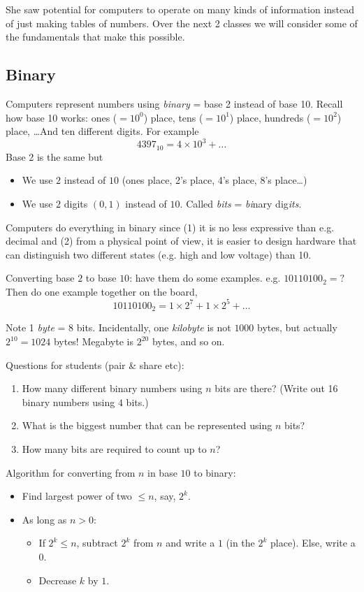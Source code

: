 \documentclass{article}
\begin{document}
She saw potential for computers to operate on many kinds of
information instead of just making tables of numbers.  Over the next 2
classes we will consider some of the fundamentals that make this
possible.

\subsection*{Binary}

Computers represent numbers using \emph{binary} = base 2 instead of
base 10.  Recall how base 10 works: ones ($=10^0$) place, tens
($=10^1$) place, hundreds ($=10^2$) place, \dots  And ten different
digits.  For example \[ 4397_{10} = 4 \times 10^3 + \dots \] Base 2 is
the same but
\begin{itemize}
\item We use $2$ instead of $10$ (ones place, 2's place, 4's place,
  8's place\dots)
\item We use $2$ digits $(0,1)$ instead of $10$.  Called \emph{bits} =
  \emph{bi}nary dig\emph{its}.
\end{itemize}
Computers do everything in binary since (1) it is no less expressive
than e.g. decimal and (2) from a physical point of view, it is easier
to design hardware that can distinguish two different states
(e.g. high and low voltage) than 10.

Converting base $2$ to base $10$: have them do some
examples. e.g. $10110100_2 = ?$  Then do one example together on the
board, \[ 10110100_2 = 1 \times 2^7 + 1 \times 2^5 + \dots \]

Note 1 \emph{byte} = 8 bits.  Incidentally, one \emph{kilobyte} is not
$1000$ bytes, but actually $2^{10} = 1024$ bytes!  Megabyte is
$2^{20}$ bytes, and so on.

Questions for students (pair \& share etc):
\begin{enumerate}
\item How many different binary numbers using $n$ bits are there?
  (Write out 16 binary numbers using $4$ bits.)
\item What is the biggest number that can be represented using $n$
  bits?
\item How many bits are required to count up to $n$?
\end{enumerate}

Algorithm for converting from $n$ in base $10$ to binary:
\begin{itemize}
\item Find largest power of two $\leq n$, say, $2^k$.
\item As long as $n > 0$:
  \begin{itemize}
  \item If $2^k \leq n$, subtract $2^k$ from $n$ and write a $1$
    (in the $2^k$ place). Else, write a $0$.
  \item Decrease $k$ by $1$.
  \end{itemize}
\end{itemize}
\end{document}
